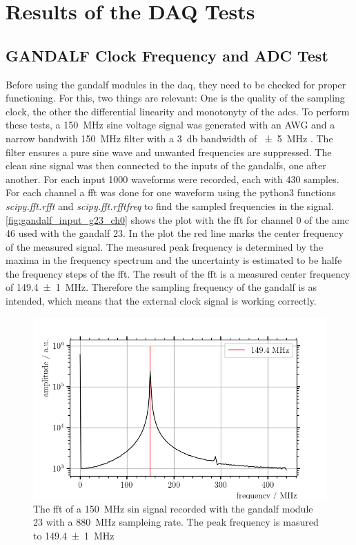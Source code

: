 \chapter{Results of the DAQ Tests}


\section{GANDALF Clock Frequency and ADC Test}
Before using the \ac{gandalf} modules in the \ac{daq}, they need to be checked for proper functioning.
For this, two things are relevant:
One is the quality of the sampling clock, the other the differential linearity and monotonyty of the \acp{adc}.
To perform these tests, a \SI{150}{\mega\hertz} sine voltage signal was generated with an AWG and a narrow bandwith \SI{150}{\mega\hertz} filter with a \SI{3}{\decibel} bandwidth of \SI{+-5}{\mega\hertz} \cite{Herrmann}.
The filter ensures a pure sine wave and unwanted frequencies are suppressed.
The clean sine signal was then connected to the inputs of the \acp{gandalf}, one after another.
For each input \num{1000} waveforms were recorded, each with 430 samples.
For each channel a \ac{fft} was done for one waveform using the python3 functions \textit{scipy.fft.rfft} and \textit{scipy.fft.rfftfreq} to find the sampled frequencies in the signal.
\autoref{fig:gandalf_input_g23_ch0} shows the plot with the \ac{fft} for channel 0 of the \ac{amc} 46 used with the \ac{gandalf} 23.
In the plot the red line marks the center frequency of the measured signal.
The measured peak frequency is determined by the maxima in the frequency spectrum and the uncertainty is estimated to be halfe the frequency steps of the \ac{fft}.
The result of the \ac{fft} is a measured center frequency of \SI{149.4(10)}{\mega\hertz}.
Therefore the sampling frequency of the \ac{gandalf} is as intended, which means that the external clock signal is working correctly.
\begin{figure}
	\centering
	\includegraphics[width=1.\textwidth]{pictures/gandalf_23_input_ch0}
	\caption[FFT of a \SI{150}{\mega\hertz} sin signal recorded with a GANDALF module.]{The \ac{fft} of a \SI{150}{\mega\hertz} sin signal recorded with the \ac{gandalf} module 23 with a \SI{880}{\mega\hertz} sampleing rate. The peak frequency is masured to \SI{149.4(10)}{\mega\hertz}}
	\label{fig:input_offset_b2_ch0}
\end{figure}



